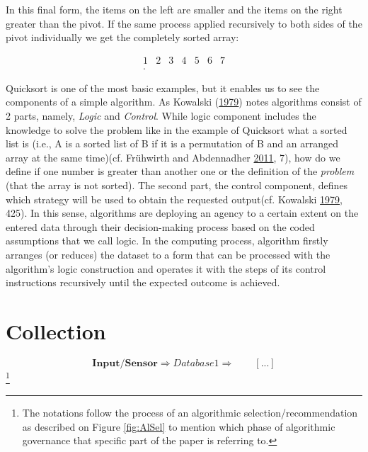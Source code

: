 \documentclass[12pt,twoside]{report}
\let\rmarkdownfootnote\footnote%
\def\footnote{\protect\rmarkdownfootnote}
\begin{document}
In this final form, the items on the left are smaller and the items on the right greater than the pivot. If the same process applied recursively to both sides of the pivot individually we get the completely sorted array:

\[\begin{array}{ccccccc}
 1 &  2 & 3 & 4 & 5 & 6 & 7 \\
.\end{array}\]

Quicksort is one of the most basic examples, but it enables us to see the components of a simple algorithm. As Kowalski (\protect\hyperlink{ref-Kowalski1979}{1979}) notes algorithms consist of 2 parts, namely, \emph{Logic} and \emph{Control}. While logic component includes the knowledge to solve the problem like in the example of Quicksort what a sorted list is (i.e., A is a sorted list of B if it is a permutation of B and an arranged array at the same time)(cf. Frühwirth and Abdennadher \protect\hyperlink{ref-Fruxfchwirth2011}{2011}, 7), how do we define if one number is greater than another one or the definition of the \emph{problem} (that the array is not sorted). The second part, the control component, defines which strategy will be used to obtain the requested output(cf. Kowalski \protect\hyperlink{ref-Kowalski1979}{1979}, 425). In this sense, algorithms are deploying an agency to a certain extent on the entered data through their decision-making process based on the coded assumptions that we call logic. In the computing process, algorithm firstly arranges (or reduces) the dataset to a form that can be processed with the algorithm's logic construction and operates it with the steps of its control instructions recursively until the expected outcome is achieved.

\hypertarget{collection}{%
\section{Collection}\label{collection}}

\[ \textbf{Input/Sensor} \Rightarrow Database 1 \Rightarrow \qquad [...]\]\footnote{The notations follow the process of an algorithmic selection/recommendation as described on Figure \ref{fig:AlSel} to mention which phase of algorithmic governance that specific part of the paper is referring to.}
\end{document}
